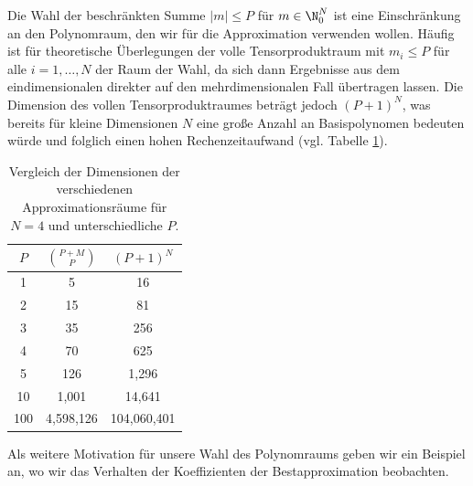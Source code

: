 \begin{mathbem}
Die Wahl der beschränkten Summe $|m|\le P$ für $m\in\N_0^N$ ist eine Einschränkung an den Polynomraum, den wir für die Approximation verwenden wollen. Häufig ist für theoretische Überlegungen der volle Tensorproduktraum mit $m_i\le P$ für alle $i=1,\dots,N$ der Raum der Wahl, da sich dann Ergebnisse aus dem eindimensionalen direkter auf den mehrdimensionalen Fall übertragen lassen. Die Dimension des vollen Tensorproduktraumes beträgt jedoch $(P+1)^N$, was bereits für kleine Dimensionen $N$ eine große Anzahl an Basispolynomen bedeuten würde und folglich einen hohen Rechenzeitaufwand (vgl. Tabelle \ref{table:poly_space_dim}).
\begin{table}
\centering
\begin{tabular}{c|cc}
$P$ & $\binom{P+M}{P}$ & $(P+1)^N$\\
\hline
1  &  5  &  16 \\
2  &  15  &  81 \\
3  &  35  &  256 \\
4  &  70  &  625 \\
5  &  126  &  1,296 \\
10  &  1,001  &  14,641 \\
100  &  4,598,126  &  104,060,401 
\end{tabular}
\caption{Vergleich der Dimensionen der verschiedenen Approximationsräume für $N=4$ und unterschiedliche $P$.}
\label{table:poly_space_dim}
\end{table}
\end{mathbem}
Als weitere Motivation für unsere Wahl des Polynomraums geben wir ein Beispiel an, wo wir das Verhalten der Koeffizienten der Bestapproximation beobachten.
